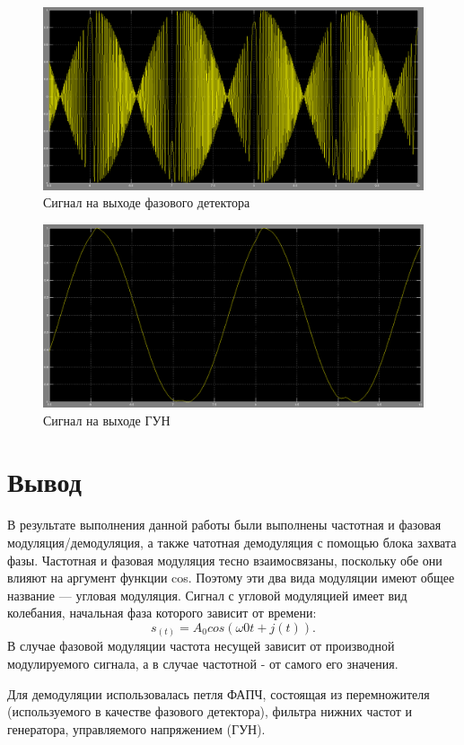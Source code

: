 \begin{figure}[H]

\includegraphics[width=150mm, scale = 0.9]{lab8/8_16}
   \caption{Сигнал на выходе фазового детектора}

\end{figure}
\begin{figure}[H]

\includegraphics[width=150mm, scale = 0.9]{lab8/8_17}
   \caption{Сигнал на выходе ГУН}

\end{figure}
\section{Вывод}

В результате выполнения данной работы были выполнены частотная и фазовая модуляция/демодуляция, а также чатотная демодуляция с  помощью блока захвата фазы. Частотная и фазовая модуляция тесно взаимосвязаны, поскольку обе они влияют на аргумент функции cos. Поэтому эти два вида модуляции имеют общее название — угловая модуляция. Сигнал с угловой модуляцией имеет вид колебания, начальная фаза которого зависит от времени:
	\begin{equation}
	s_(t) = A_0 cos(\omega0 t + j(t)).
	\end{equation}
В случае фазовой модуляции частота несущей зависит от производной модулируемого сигнала, а в случае частотной - от самого его значения.

Для демодуляции использовалась петля ФАПЧ, состоящая из перемножителя (используемого в качестве фазового детектора), фильтра нижних частот и генератора, управляемого напряжением (ГУН).
